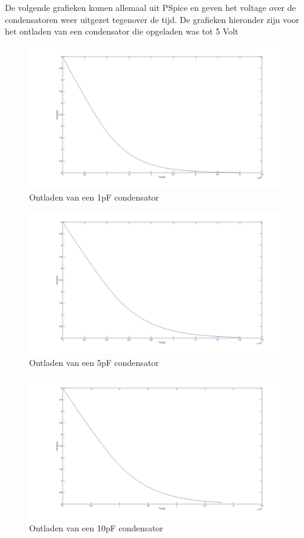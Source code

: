 \documentclass{article}
\begin{document}
De volgende grafieken komen allemaal uit PSpice en geven het voltage over de condensatoren weer uitgezet tegenover de tijd. De grafieken hieronder zijn voor het ontladen van een condensator die opgeladen was tot 5 Volt

\begin{figure}[H]
	\centering
	\includegraphics[scale=0.2]{../figures/c1pontladen}
	\caption{Ontladen van een 1pF condensator}
\end{figure}

\begin{figure}[H]
	\centering
	\includegraphics[scale=0.2]{../figures/c5pontladen}
	\caption{Ontladen van een 5pF condensator}
\end{figure}

\begin{figure}[H]
	\centering
	\includegraphics[scale=0.2]{../figures/c10pontladen}
	\caption{Ontladen van een 10pF condensator}
\end{figure}
\end{document}
